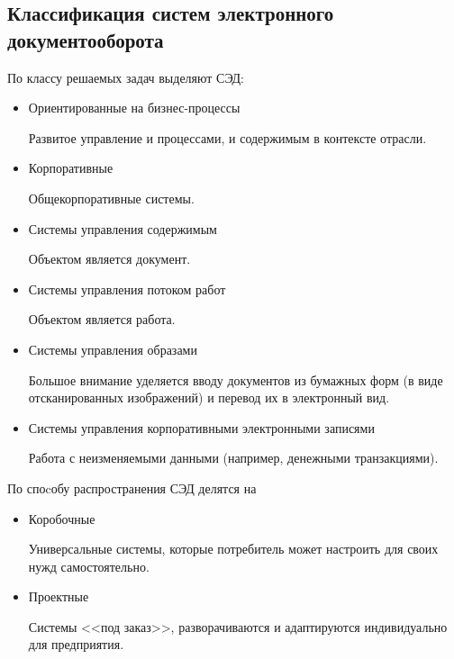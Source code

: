 \subsection{Классификация систем электронного документооборота} \label{review_classification}

По классу решаемых задач выделяют СЭД:
\begin{itemize}
	\item Ориентированные на бизнес-процессы

	Развитое управление и процессами, и содержимым в контексте отрасли.
	\item Корпоративные

	Общекорпоративные системы.
	\item Системы управления содержимым

	Объектом является документ.
	\item Системы управления потоком работ

	Объектом является работа.
	\item Системы управления образами

	Большое внимание уделяется вводу документов из бумажных форм (в виде отсканированных изображений) и перевод их в электронный вид.
	\item Системы управления корпоративными электронными записями

	Работа с неизменяемыми данными (например, денежными транзакциями).
\end{itemize}

По споcобу распространения СЭД делятся на
\begin{itemize}
	\item Коробочные

	Универсальные системы, которые потребитель может настроить для своих нужд самостоятельно.
	\item Проектные

	Системы <<под заказ>>, разворачиваются и адаптируются индивидуально для предприятия.
\end{itemize}